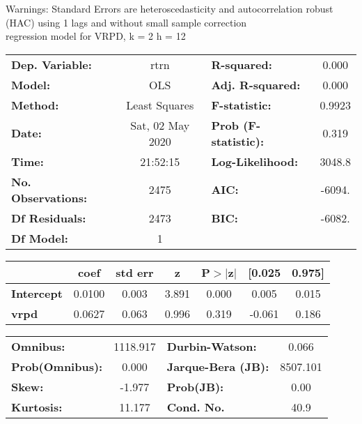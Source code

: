 Warnings: \newline
 [1] Standard Errors are heteroscedasticity and autocorrelation robust (HAC) using 1 lags and without small sample correction\\ 

regression model for VRPD, k = 2 h = 12\begin{center}
\begin{tabular}{lclc}
\toprule
\textbf{Dep. Variable:}    &       rtrn       & \textbf{  R-squared:         } &     0.000   \\
\textbf{Model:}            &       OLS        & \textbf{  Adj. R-squared:    } &     0.000   \\
\textbf{Method:}           &  Least Squares   & \textbf{  F-statistic:       } &    0.9923   \\
\textbf{Date:}             & Sat, 02 May 2020 & \textbf{  Prob (F-statistic):} &    0.319    \\
\textbf{Time:}             &     21:52:15     & \textbf{  Log-Likelihood:    } &    3048.8   \\
\textbf{No. Observations:} &        2475      & \textbf{  AIC:               } &    -6094.   \\
\textbf{Df Residuals:}     &        2473      & \textbf{  BIC:               } &    -6082.   \\
\textbf{Df Model:}         &           1      & \textbf{                     } &             \\
\bottomrule
\end{tabular}
\begin{tabular}{lcccccc}
                   & \textbf{coef} & \textbf{std err} & \textbf{z} & \textbf{P$> |$z$|$} & \textbf{[0.025} & \textbf{0.975]}  \\
\midrule
\textbf{Intercept} &       0.0100  &        0.003     &     3.891  &         0.000        &        0.005    &        0.015     \\
\textbf{vrpd}      &       0.0627  &        0.063     &     0.996  &         0.319        &       -0.061    &        0.186     \\
\bottomrule
\end{tabular}
\begin{tabular}{lclc}
\textbf{Omnibus:}       & 1118.917 & \textbf{  Durbin-Watson:     } &    0.066  \\
\textbf{Prob(Omnibus):} &   0.000  & \textbf{  Jarque-Bera (JB):  } & 8507.101  \\
\textbf{Skew:}          &  -1.977  & \textbf{  Prob(JB):          } &     0.00  \\
\textbf{Kurtosis:}      &  11.177  & \textbf{  Cond. No.          } &     40.9  \\
\bottomrule
\end{tabular}
\end{center}


